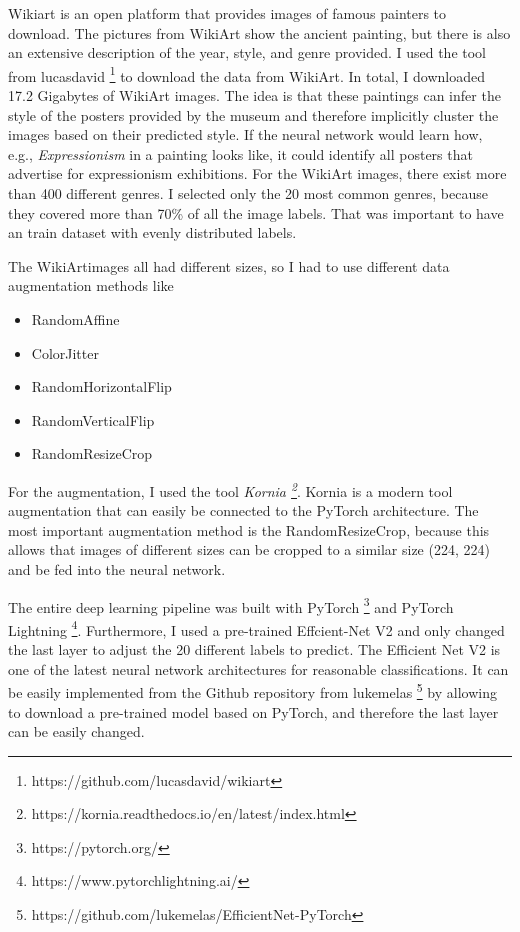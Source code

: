 \documentclass[conference]{IEEEtran}
\begin{document}
Wikiart is an open platform that provides images of famous painters to download. The pictures from WikiArt show the ancient painting, but there is also an extensive description of the year, style, and genre provided. I used the tool from lucasdavid \footnote{https://github.com/lucasdavid/wikiart} to download the data from WikiArt. In total, I downloaded 17.2 Gigabytes of WikiArt images. The idea is that these paintings can infer the style of the posters provided by the museum and therefore implicitly cluster the images based on their predicted style. If the neural network would learn how, e.g., \textit{Expressionism} in a painting looks like, it could identify all posters that advertise for expressionism exhibitions. For the WikiArt images, there exist more than 400 different genres. I selected only the 20 most common genres, because they covered more than 70\% of all the image labels. That was important to have an train dataset with evenly distributed labels.

The WikiArtimages all had different sizes, so I had to use different data augmentation methods like \newline

\begin{itemize}
\item RandomAffine
\item ColorJitter
\item RandomHorizontalFlip
\item RandomVerticalFlip
\item RandomResizeCrop \newline
\end{itemize}

For the augmentation, I used the tool \textit{Kornia \footnote{https://kornia.readthedocs.io/en/latest/index.html}}. Kornia is a modern tool augmentation \cite{Riba.05.10.2019} that can easily be connected to the PyTorch architecture. The most important augmentation method is the RandomResizeCrop, because this allows that images of different sizes can be cropped to a similar size (224, 224) and be fed into the neural network.

The entire deep learning pipeline was built with PyTorch \footnote{https://pytorch.org/} and PyTorch Lightning \footnote{https://www.pytorchlightning.ai/}. Furthermore, I used a pre-trained Effcient-Net V2 and only changed the last layer to adjust the 20 different labels to predict. The Efficient Net V2 \cite{Tan.} is one of the latest neural network architectures for reasonable classifications. It can be easily implemented from the Github repository from lukemelas \footnote{https://github.com/lukemelas/EfficientNet-PyTorch} by allowing to download a pre-trained model based on PyTorch, and therefore the last layer can be easily changed.
\end{document}
